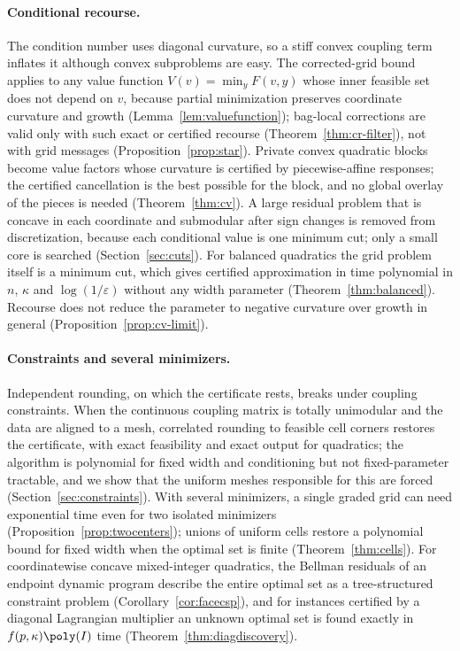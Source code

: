 \paragraph{Conditional recourse.}
The condition number uses diagonal curvature, so a stiff convex coupling term
inflates it although convex subproblems are easy. The corrected-grid bound
applies to any value function $V(v)=\min_yF(v,y)$ whose inner feasible set does
not depend on $v$, because partial minimization preserves coordinate curvature
and growth (Lemma~\ref{lem:valuefunction}); bag-local corrections are valid
only with such exact or certified recourse (Theorem~\ref{thm:cr-filter}), not
with grid messages (Proposition~\ref{prop:star}). Private convex quadratic
blocks become value factors whose curvature is certified by piecewise-affine
responses; the certified cancellation is the best possible for the block, and
no global overlay of the pieces is needed (Theorem~\ref{thm:cv}). A large
residual problem that is concave in each coordinate and submodular after sign
changes is removed from discretization, because each conditional value is one
minimum cut; only a small core is searched (Section~\ref{sec:cuts}). For balanced
quadratics the grid problem itself is a minimum cut, which gives certified
approximation in time polynomial in $n$, $\kappa$ and $\log(1/\varepsilon)$
without any width parameter (Theorem~\ref{thm:balanced}). Recourse does not
reduce the parameter to negative curvature over growth in general
(Proposition~\ref{prop:cv-limit}).

\paragraph{Constraints and several minimizers.}
Independent rounding, on which the certificate rests, breaks under coupling
constraints. When the continuous coupling matrix is totally unimodular and the
data are aligned to a mesh, correlated rounding to feasible cell corners
restores the certificate, with exact feasibility and exact output for
quadratics; the algorithm is polynomial for fixed width and conditioning but
not fixed-parameter tractable, and we show that the uniform meshes responsible
for this are forced (Section~\ref{sec:constraints}). With several minimizers, a
single graded grid can need exponential time even for two isolated minimizers
(Proposition~\ref{prop:twocenters}); unions of uniform cells restore a
polynomial bound for fixed width when the optimal set is finite
(Theorem~\ref{thm:cells}). For coordinatewise concave mixed-integer
quadratics, the Bellman residuals of an endpoint dynamic program describe the
entire optimal set as a tree-structured constraint problem
(Corollary~\ref{cor:facecsp}), and for instances certified by a diagonal
Lagrangian multiplier an unknown optimal set is found exactly in
$f(p,\kappa)\poly(I)$ time (Theorem~\ref{thm:diagdiscovery}).

